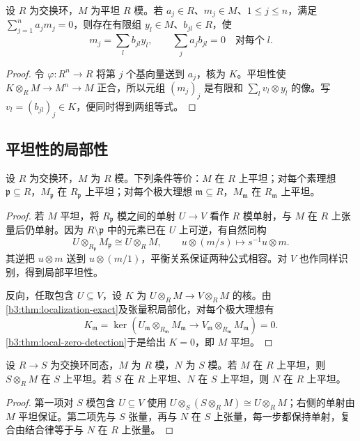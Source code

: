 \begin{lemma}[平坦模中的有限关系]\label{b3:lem:flat-relations}
	设 \(R\) 为交换环，\(M\) 为平坦 \(R\) 模。若 \(a_j\in R\)、\(m_j\in M\)、\(1\le j\le n\)，满足 \(\sum_{j=1}^n a_jm_j=0\)，则存在有限组 \(y_l\in M\)、\(b_{jl}\in R\)，使
	\[
		m_j=\sum_l b_{jl}y_l,\qquad \sum_j a_jb_{jl}=0\quad\text{对每个}\;l.
	\]
\end{lemma}
\begin{proof}
	令 \(\varphi:R^n\to R\) 将第 \(j\) 个基向量送到 \(a_j\)，核为 \(K\)。平坦性使 \(K\otimes_RM\to M^n\to M\) 正合，所以元组 \((m_j)_j\) 是有限和 \(\sum_l v_l\otimes y_l\) 的像。写 \(v_l=(b_{jl})_j\in K\)，便同时得到两组等式。
\end{proof}

\subsection{平坦性的局部性}\label{b3:subsec:1201:02}

\begin{theorem}\label{b3:thm:flatness-local}
	设 \(R\) 为交换环，\(M\) 为 \(R\) 模。下列条件等价：\(M\) 在 \(R\) 上平坦；对每个素理想 \(\mathfrak p\subseteq R\)，\(M_{\mathfrak p}\) 在 \(R_{\mathfrak p}\) 上平坦；对每个极大理想 \(\mathfrak m\subseteq R\)，\(M_{\mathfrak m}\) 在 \(R_{\mathfrak m}\) 上平坦。
\end{theorem}
\begin{proof}
	若 \(M\) 平坦，将 \(R_{\mathfrak p}\) 模之间的单射 \(U\to V\) 看作 \(R\) 模单射，与 \(M\) 在 \(R\) 上张量后仍单射。因为 \(R\setminus\mathfrak p\) 中的元素已在 \(U\) 上可逆，有自然同构
	\[
		U\otimes_{R_{\mathfrak p}}M_{\mathfrak p}\cong U\otimes_RM, \qquad u\otimes(m/s)\longmapsto s^{-1}u\otimes m.
	\]
	其逆把 \(u\otimes m\) 送到 \(u\otimes(m/1)\)，平衡关系保证两种公式相容。对 \(V\) 也作同样识别，得到局部平坦性。

	反向，任取包含 \(U\subseteq V\)，设 \(K\) 为 \(U\otimes_RM\to V\otimes_RM\) 的核。由\cref{b3:thm:localization-exact}及张量积局部化，对每个极大理想有
	\[
		K_{\mathfrak m} =\ker\left(U_{\mathfrak m}\otimes_{R_{\mathfrak m}}M_{\mathfrak m} \longrightarrow V_{\mathfrak m}\otimes_{R_{\mathfrak m}}M_{\mathfrak m}\right)=0.
	\]
	\cref{b3:thm:local-zero-detection}于是给出 \(K=0\)，即 \(M\) 平坦。
\end{proof}

\begin{proposition}\label{b3:prop:flat-base-change-transitivity}
	设 \(R\to S\) 为交换环同态，\(M\) 为 \(R\) 模，\(N\) 为 \(S\) 模。若 \(M\) 在 \(R\) 上平坦，则 \(S\otimes_RM\) 在 \(S\) 上平坦。若 \(S\) 在 \(R\) 上平坦、\(N\) 在 \(S\) 上平坦，则 \(N\) 在 \(R\) 上平坦。
\end{proposition}
\begin{proof}
	第一项对 \(S\) 模包含 \(U\subseteq V\) 使用 \(U\otimes_S(S\otimes_RM)\cong U\otimes_RM\)；右侧的单射由 \(M\) 平坦保证。第二项先与 \(S\) 张量，再与 \(N\) 在 \(S\) 上张量，每一步都保持单射，复合由结合律等于与 \(N\) 在 \(R\) 上张量。
\end{proof}

